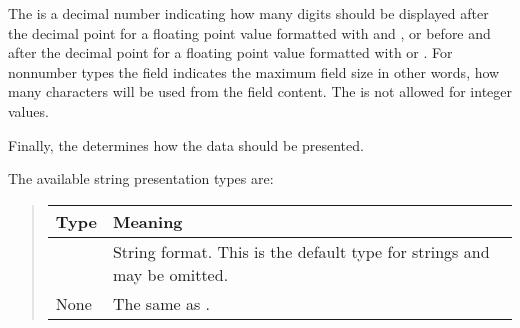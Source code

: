 \documentclass[letterpaper,10pt,english]{sphinxmanual}
\begin{document}
The  is a decimal number indicating how many digits should be
displayed after the decimal point for a floating point value formatted with
 and , or before and after the decimal point for a floating point
value formatted with  or .  For non\sphinxhyphen{}number types the field
indicates the maximum field size \sphinxhyphen{} in other words, how many characters will be
used from the field content. The  is not allowed for integer values.

Finally, the  determines how the data should be presented.

The available string presentation types are:
\begin{quote}


\begin{savenotes}\sphinxattablestart
\centering
\begin{tabulary}{\linewidth}[t]{|T|T|}
\hline
\sphinxstyletheadfamily
Type
&\sphinxstyletheadfamily
Meaning
\\
\hline
{}
&
String format. This is the default type for strings and
may be omitted.
\\
\hline
None
&
The same as .
\\
\hline
\end{tabulary}
\par
\sphinxattableend\end{savenotes}
\end{quote}
\end{document}
